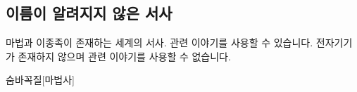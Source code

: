 \documentclass{report}
\begin{document}
	\subsection*{이름이 알려지지 않은 서사}
		마법과 이종족이 존재하는 세계의 서사. 관련 이야기를 사용할 수 있습니다. 전자기기가 존재하지 않으며 관련 이야기를 사용할 수 없습니다.
		
	\begin{story}{숨바꼭질}{[마법사]}
	\end{story}
\end{document}
